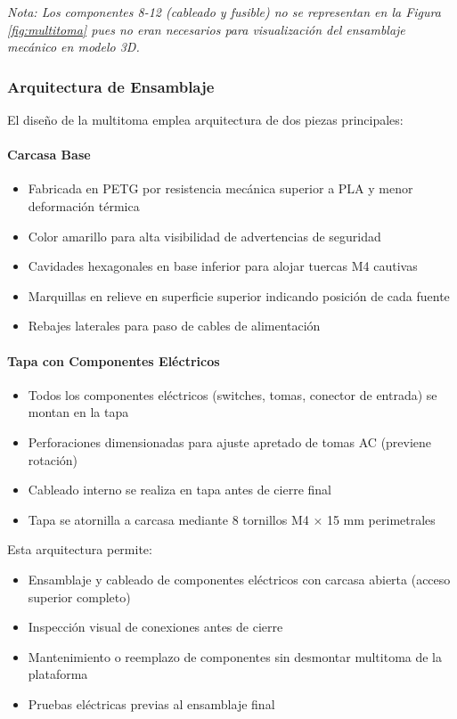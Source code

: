 \textit{Nota: Los componentes 8-12 (cableado y fusible) no se representan en la Figura \ref{fig:multitoma} pues no eran necesarios para visualización del ensamblaje mecánico en modelo 3D.}

\subsubsection{Arquitectura de Ensamblaje}

El diseño de la multitoma emplea arquitectura de dos piezas principales:

\paragraph{Carcasa Base}

\begin{itemize}
    \item Fabricada en PETG por resistencia mecánica superior a PLA y menor deformación térmica
    \item Color amarillo para alta visibilidad de advertencias de seguridad
    \item Cavidades hexagonales en base inferior para alojar tuercas M4 cautivas
    \item Marquillas en relieve en superficie superior indicando posición de cada fuente
    \item Rebajes laterales para paso de cables de alimentación
\end{itemize}

\paragraph{Tapa con Componentes Eléctricos}

\begin{itemize}
    \item Todos los componentes eléctricos (switches, tomas, conector de entrada) se montan en la tapa
    \item Perforaciones dimensionadas para ajuste apretado de tomas AC (previene rotación)
    \item Cableado interno se realiza en tapa antes de cierre final
    \item Tapa se atornilla a carcasa mediante 8 tornillos M4 × 15 mm perimetrales
\end{itemize}

Esta arquitectura permite:
\begin{itemize}
    \item Ensamblaje y cableado de componentes eléctricos con carcasa abierta (acceso superior completo)
    \item Inspección visual de conexiones antes de cierre
    \item Mantenimiento o reemplazo de componentes sin desmontar multitoma de la plataforma
    \item Pruebas eléctricas previas al ensamblaje final
\end{itemize}

